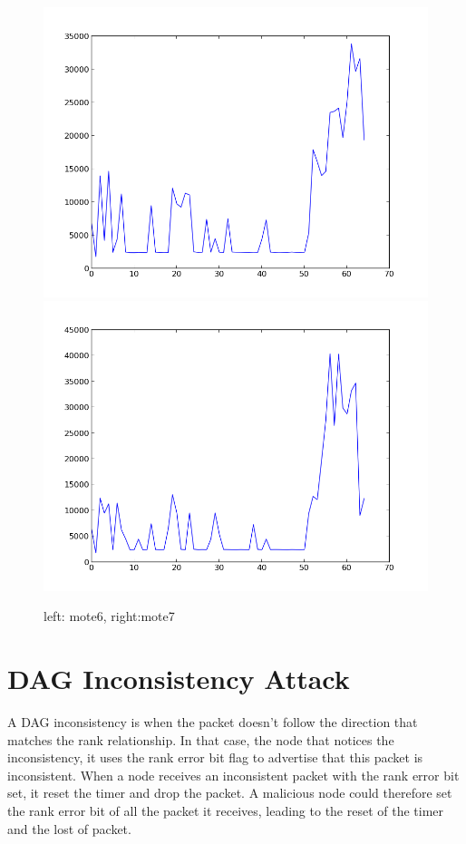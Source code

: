 \documentclass{report}
\begin{document}
\begin{figure}[ht!]
\centering
\includegraphics[scale=0.35]{img/mote6}
\includegraphics[scale=0.35]{img/mote7}
\caption{left: mote6, right:mote7}
\end{figure}





\section{DAG Inconsistency Attack}
A DAG inconsistency is when the packet doesn't follow the direction that
matches the rank relationship. In that case, the node that notices the
inconsistency, it uses the rank error bit flag to advertise that this
packet is inconsistent. When a node receives an inconsistent packet with
the rank error bit set, it reset the timer and drop the packet. A
malicious node could therefore set the rank error bit of all the packet
it receives, leading to the reset of the timer and the lost of packet.\\
\end{document}

